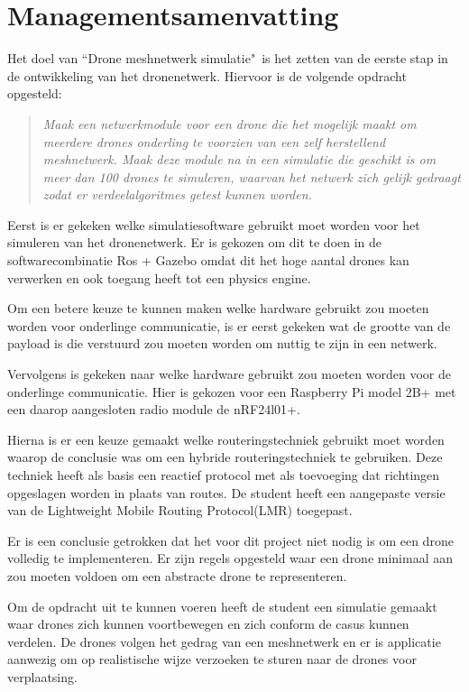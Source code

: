 \documentclass[a4paper, 11pt, oneside]{report}
\begin{document}
\chapter*{Managementsamenvatting}\label{sec:managementsamenvatting}
Het doel van ``Drone meshnetwerk simulatie"\ is het zetten van de eerste stap in de ontwikkeling van het dronenetwerk. Hiervoor is de volgende opdracht opgesteld:
\begin{quotation}
	\textit{Maak een netwerkmodule voor een drone die het mogelijk maakt om meerdere drones onderling te voorzien van een zelf herstellend meshnetwerk. Maak deze module na in een simulatie die geschikt is om meer dan 100 drones te simuleren, waarvan het netwerk zich gelijk gedraagt zodat er verdeelalgoritmes getest kunnen worden.}
\end{quotation}


Eerst is er gekeken welke simulatiesoftware gebruikt moet worden voor het simuleren van het dronenetwerk.
Er is gekozen om dit te doen in de softwarecombinatie Ros + Gazebo omdat dit het hoge aantal drones kan verwerken en ook toegang heeft tot een physics engine.

Om een betere keuze te kunnen maken welke hardware gebruikt zou moeten worden voor onderlinge communicatie, is er eerst gekeken wat de grootte van de payload is die verstuurd zou moeten worden om nuttig te zijn in een netwerk.

Vervolgens is gekeken naar welke hardware gebruikt zou moeten worden voor de onderlinge communicatie. Hier is gekozen voor een Raspberry Pi model 2B+ met een daarop aangesloten radio module de nRF24l01+.

Hierna is er een keuze gemaakt welke routeringstechniek gebruikt moet worden waarop de conclusie was om een hybride routeringstechniek te gebruiken. Deze techniek heeft als basis een reactief protocol met als toevoeging dat richtingen opgeslagen worden in plaats van routes. De student heeft een aangepaste versie van de Lightweight Mobile Routing Protocol(LMR) toegepast. 

Er is een conclusie getrokken dat het voor dit project niet nodig is om een drone volledig te implementeren. Er zijn regels opgesteld waar een drone minimaal aan zou moeten voldoen om een abstracte drone te representeren. 

Om de opdracht uit te kunnen voeren heeft de student een simulatie gemaakt waar drones zich kunnen voortbewegen en zich conform de casus kunnen verdelen. De drones volgen het gedrag van een meshnetwerk en er is applicatie aanwezig om op realistische wijze verzoeken te sturen naar de drones voor verplaatsing. 
\end{document}
